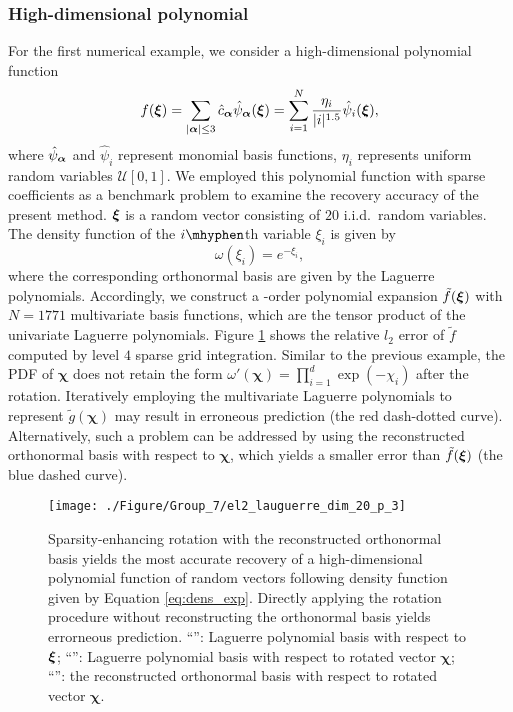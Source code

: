 \subsubsection{High-dimensional polynomial}
For the first numerical example, we consider a high-dimensional polynomial function 
\begin{equation}
f(\bm\xi) = \sum_{ \vert \bm\alpha \vert \le 3} \hat{c}_{\bm\alpha} \hat{\psi}_{\bm\alpha}(\bm\xi) 
=   \sum_{i = 1}^N \frac{\eta_i}{\vert i \vert^{1.5}} \hat{\psi}_{i}(\bm\xi),
\label{eq:poly_dim_20_p_3}  
\end{equation}
where $\hat{\psi}_{\bm\alpha}$ and $\hat{\psi}_{i}$ represent monomial basis functions, $\eta_i$ 
represents uniform random variables $\mathcal{U}\left[0,1\right].$  {We employed
this polynomial function with sparse coefficients as a benchmark problem to examine the recovery
accuracy of the present method.} $\bm\xi$ is a random vector consisting of $20$ i.i.d.\ random variables. 
The density function of the $i\mhyphen$th variable $\xi_i$ is given by 
\begin{equation}
\omega(\xi_i) = e^{-\xi_i},
\label{eq:dens_exp}  
\end{equation}
where the corresponding orthonormal basis are given by the Laguerre polynomials. Accordingly, we construct
a -order polynomial expansion $\tilde{f}(\bm\xi)$ with $N = 1771$ multivariate basis functions,  
which are the tensor product of the univariate Laguerre polynomials. Figure \ref{fig:l2_lauguerre} 
shows the relative $l_2$ error of $\tilde{f}$ computed by level $4$ sparse grid integration.
Similar to the previous example, the \ac{PDF} of $\bm\chi$ does not
retain the form $\omega'(\bm\chi) = \prod_{i=1}^d \exp(-\chi_i)$ after the rotation. Iteratively employing the 
multivariate Laguerre polynomials to represent $\tilde{g}(\bm\chi)$ may result in erroneous prediction (the red dash-dotted curve).
Alternatively, such a problem can be addressed by using the reconstructed orthonormal  basis
with respect to $\bm\chi$, which yields a smaller error than $\tilde{f}(\bm\xi)$ (the blue dashed curve).

\begin{figure}[htbp]
\center
\texttt{[image: ./Figure/Group\_7/el2\_lauguerre\_dim\_20\_p\_3]}
\caption{Sparsity-enhancing rotation with the reconstructed orthonormal  basis yields the most accurate 
  recovery of a high-dimensional polynomial function of random vectors
  following density function given by Equation \eqref{eq:dens_exp}. Directly applying the rotation procedure without
  reconstructing the orthonormal basis yields errorneous prediction. 
  ``\textcolor{red}{\protect\rectanglesolidline}'':  Laguerre polynomial basis with respect to $\bm\xi$;  
  ``\textcolor{red}{\protect\triangledashdotline}'':  Laguerre polynomial basis with respect to rotated vector $\bm\chi$;  
  ``\textcolor{blue}{\protect\downtriangledashline}'':  the reconstructed    orthonormal basis with respect to rotated vector $\bm\chi$.
}
\label{fig:l2_lauguerre}
\end{figure}

